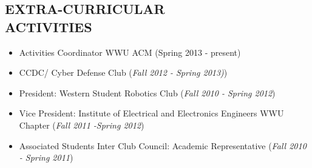 \documentclass[line,margin]{res}
\begin{document}
\begin{resume}
\section{EXTRA-CURRICULAR \\ ACTIVITIES} 
	\begin{itemize} \itemsep -1pt
	\item Activities Coordinator WWU ACM (Spring 2013 - present)
	\item CCDC/ Cyber Defense Club ({\sl Fall 2012 - Spring 2013)})
	\item President: Western Student Robotics Club ({\sl Fall 2010 - Spring 2012})
 	\item Vice President: Institute of Electrical and Electronics Engineers WWU Chapter ({\sl Fall 2011 -Spring 2012})
	\item Associated Students Inter Club Council: Academic Representative ({\sl Fall 2010 - Spring 2011})
	\end{itemize}
\end{resume}
\end{document}
